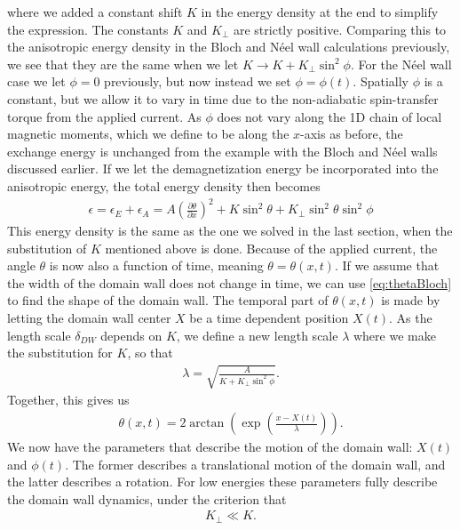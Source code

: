 \documentclass[12pt, a4paper]{article}		%
\numberwithin{equation}{section}
\begin{document}
where we added a constant shift $K$ in the energy density at the end to simplify the expression. The constants $K$ and $K_{\perp}$ are strictly positive. Comparing this to the anisotropic energy density in the Bloch and N\'{e}el wall calculations previously, we see that they are the same when we let $K \rightarrow K + K_{\perp}\sin^2\phi$. For the N\'{e}el wall case we let $\phi = 0$ previously, but now instead we set $\phi = \phi (t)$. Spatially $\phi$ is a constant, but we allow it to vary in time due to the non-adiabatic spin-transfer torque from the applied current. As $\phi$ does not vary along the 1D chain of local magnetic moments, which we define to be along the $x$-axis as before, the exchange energy is unchanged from the example with the Bloch and N\'{e}el walls discussed earlier. If we let the demagnetization energy be incorporated into the anisotropic energy, the total energy density then becomes
\begin{align}
\label{eq:energydensity_ex_a}
\epsilon = \epsilon_E + \epsilon_A = A (\frac{\partial \theta}{\partial x})^2 + K\sin^2\theta + K_{\perp} \sin^2\theta\sin^2\phi
\end{align}
This energy density is the same as the one we solved in the last section, when the substitution of $K$ mentioned above is done. Because of the applied current, the angle $\theta$ is now also a function of time, meaning $\theta = \theta(x,t)$. If we assume that the width of the domain wall does not change in time, we can use \eqref{eq:thetaBloch} to find the shape of the domain wall. The temporal part of $\theta(x,t)$ is made by letting the domain wall center $X$ be a time dependent position $X(t)$. As the length scale $\delta_{DW}$ depends on $K$, we define a new length scale $\lambda$ where we make the substitution for $K$, so that
\begin{align}
\label{eq:lambda_dw}
\lambda = \sqrt{\frac{A}{K + K_{\perp}\sin^2\phi}}.
\end{align}
Together, this gives us
\begin{align}
\label{eq:theta_current}
\theta(x,t) = 2\arctan(\exp(\frac{x-X(t)}{\lambda})).
\end{align}
We now have the parameters that describe the motion of the domain wall: $X(t)$ and $\phi(t)$. The former describes a translational motion of the domain wall, and the latter describes a rotation. For low energies these parameters fully describe the domain wall dynamics, under the criterion that
\begin{align}
\label{eq:kperp_ll_k}
K_{\perp} \ll K.
\end{align}
\end{document}
